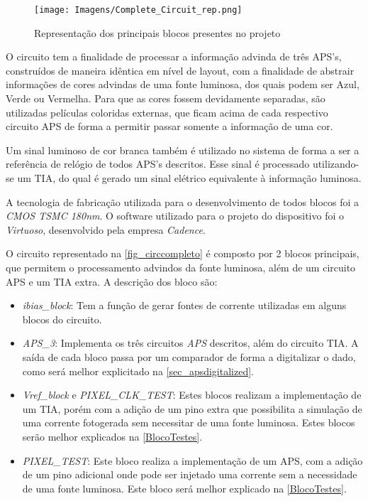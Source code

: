 \begin{figure}[!h]
	\caption{\label{fig_circcompletohigh}Representação dos principais blocos presentes no projeto}
	\begin{center}
	    \texttt{[image: Imagens/Complete\_Circuit\_rep.png]}
	\end{center}
\end{figure}


O circuito tem a finalidade de processar a informação advinda de tr\^es APS's, constru\'idos de maneira id\^entica em n\'ivel de layout, com a finalidade de abstrair informações de cores advindas de uma fonte luminosa, dos quais podem ser Azul, Verde ou Vermelha. Para que as cores fossem devidamente separadas, são utilizadas películas coloridas externas, que ficam acima de cada respectivo circuito APS de forma a permitir passar somente a informação de uma cor.

Um sinal luminoso de cor branca tamb\'em \'e utilizado no sistema de forma a ser a refer\^encia de rel\'ogio de todos APS's descritos. Esse sinal \'e processado utilizando-se um TIA, do qual \'e gerado um sinal el\'etrico equivalente \`a informação luminosa.

A tecnologia de fabricação utilizada para o desenvolvimento de todos blocos foi a \textit{CMOS TSMC 180nm}. O software utilizado para o projeto do dispositivo foi o \textit{Virtuoso}, desenvolvido pela empresa \textit{Cadence}.

O circuito representado na \autoref{fig_circcompleto} \'e composto por 2 blocos principais, que permitem o processamento advindos da fonte luminosa, al\'em de um circuito APS e um TIA extra. A descrição dos bloco são:

\begin{itemize}
    \item \textit{ibias\_block}: Tem a função de gerar fontes de corrente utilizadas em alguns blocos do circuito.
    
    \item \textit{APS\_3}: Implementa os tr\^es circuitos \textit{APS} descritos, al\'em do circuito TIA. A sa\'ida de cada bloco passa por um comparador de forma a digitalizar o dado, como ser\'a melhor explicitado na \autoref{sec_apsdigitalized}.
    
    \item \textit{Vref\_block} e \textit{PIXEL\_CLK\_TEST}: Estes blocos realizam a implementação de um TIA, por\'em com a adição de um pino extra que possibilita a simulação de uma corrente fotogerada sem necessitar de uma fonte luminosa. Estes blocos serão melhor explicados na \autoref{BlocoTestes}. 
    
    \item \textit{PIXEL\_TEST}: Este bloco realiza a implementação de um APS, com a adição de um pino adicional onde pode ser injetado uma corrente sem a necessidade de uma fonte luminosa. Este bloco será melhor explicado na \autoref{BlocoTestes}.
    
\end{itemize}

